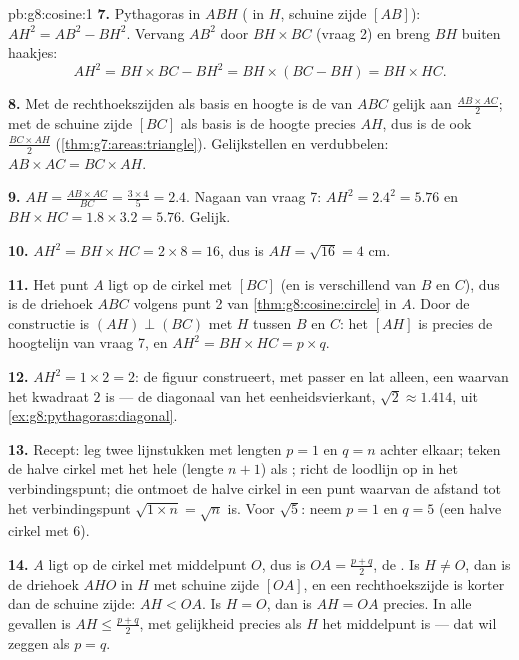 \begin{solution}{pb:g8:cosine:1}
\textbf{7.} Pythagoras in $ABH$ ( in $H$, schuine zijde $[AB]$):
$AH^2 = AB^2 - BH^2$. Vervang $AB^2$ door $BH \times BC$ (vraag 2) en breng $BH$
buiten haakjes:
\[
AH^2 = BH \times BC - BH^2
= BH \times (BC - BH)
= BH \times HC .
\]

\textbf{8.} Met de rechthoekszijden als basis en hoogte is de  van
$ABC$ gelijk aan $\frac{AB \times AC}{2}$; met de schuine zijde $[BC]$ als basis
is de hoogte precies $AH$, dus is de  ook
$\frac{BC \times AH}{2}$ (\cref{thm:g7:areas:triangle}). Gelijkstellen en
verdubbelen: $AB \times AC = BC \times AH$.

\textbf{9.} $AH = \frac{AB \times AC}{BC} = \frac{3 \times 4}{5} = 2.4$.
Nagaan van vraag 7: $AH^2 = 2.4^2 = 5.76$ en
$BH \times HC = 1.8 \times 3.2 = 5.76$. Gelijk.

\textbf{10.} $AH^2 = BH \times HC = 2 \times 8 = 16$, dus is
$AH = \sqrt{16} = 4$ cm.

\textbf{11.} Het punt $A$ ligt op de cirkel met  $[BC]$ (en is
verschillend van $B$ en $C$), dus is de driehoek $ABC$ volgens punt 2 van
\cref{thm:g8:cosine:circle}  in $A$. Door de constructie is
$(AH) \perp (BC)$ met $H$ tussen $B$ en $C$: het  $[AH]$ is precies de
hoogtelijn van vraag 7, en $AH^2 = BH \times HC = p \times q$.

\textbf{12.} $AH^2 = 1 \times 2 = 2$: de figuur construeert, met passer en lat
alleen, een  waarvan het kwadraat $2$ is --- de diagonaal van het
eenheidsvierkant, $\sqrt2 \approx 1.414$, uit
\cref{ex:g8:pythagoras:diagonal}.

\textbf{13.} Recept: leg twee lijnstukken met lengten $p = 1$ en $q = n$ achter
elkaar; teken de halve cirkel met het hele  (lengte $n + 1$) als
; richt de loodlijn op in het verbindingspunt; die ontmoet de halve
cirkel in een punt waarvan de afstand tot het verbindingspunt
$\sqrt{1 \times n} = \sqrt n$ is. Voor $\sqrt5$: neem $p = 1$ en $q = 5$ (een
halve cirkel met  $6$).

\textbf{14.} $A$ ligt op de cirkel met middelpunt $O$, dus is
$OA = \frac{p+q}{2}$, de . Is $H \neq O$, dan is de driehoek $AHO$
 in $H$ met schuine zijde $[OA]$, en een rechthoekszijde is korter dan
de schuine zijde: $AH < OA$. Is $H = O$, dan is $AH = OA$ precies. In alle
gevallen is $AH \leq \frac{p+q}{2}$, met gelijkheid precies als $H$ het
middelpunt is --- dat wil zeggen als $p = q$.


\end{solution}
